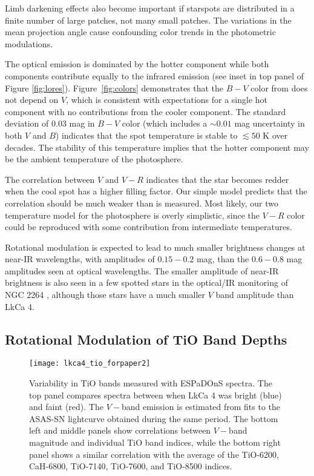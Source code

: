 \documentclass[twocolumn]{emulateapj}%
\begin{document}
Limb darkening effects also become important if starspots are distributed in a finite number of large patches, not many small patches.  The variations in the mean projection angle cause confounding color trends in the photometric modulations.

The optical emission is dominated by the hotter component while both components contribute equally to the infrared emission (see inset in top panel of Figure \ref{fig:lores}).  Figure~\ref{fig:colors} demonstrates that the $B-V$ color from \citet{grankin08} does not depend on $V$, which is consistent with expectations for a single hot component with no contributions from the cooler component.  The standard deviation of 0.03 mag in $B-V$ color (which includes a $\sim 0.01$ mag uncertainty in both $V$ and $B$) indicates that the spot temperature is stable to $\lesssim 50$ K over decades.  The stability of this temperature implies that the hotter component may be the ambient temperature of the photosphere.

The correlation between $V$ and $V-R$ indicates that the star becomes redder when the cool spot has a higher filling factor.  Our simple model predicts that the correlation should be much weaker than is measured.  Most likely, our two temperature model for the photosphere is overly simplistic, since the $V-R$ color could be reproduced with some contribution from intermediate temperatures.

Rotational modulation is expected to lead to much smaller brightness changes at near-IR wavelengths, with amplitudes of $0.15-0.2$ mag, than the $0.6-0.8$ mag amplitudes seen at optical wavelengths.  The smaller amplitude of near-IR brightness is also seen in a few spotted stars in the optical/IR monitoring of NGC 2264 \citep{cody14}, although those stars have a much smaller $V$ band amplitude than LkCa 4.

\subsection{Rotational Modulation of TiO Band Depths}\label{sec:RotTiO}

\begin{figure*}
 \centering
 \texttt{[image: lkca4\_tio\_forpaper2]}
 \caption{Variability in TiO bands measured with ESPaDOnS spectra.  The top panel compares spectra between when LkCa 4 was bright (blue) and faint (red).  The $V-$band emission is estimated from fits to the ASAS-SN lightcurve obtained during the same period.  The bottom left and middle panels show correlations between $V-$band magnitude and individual TiO band indices, while the bottom right panel shows a similar correlation with the average of the TiO-6200, CaH-6800, TiO-7140, TiO-7600, and TiO-8500 indices.}
 \label{fig:tiovar}
\end{figure*}
\end{document}
